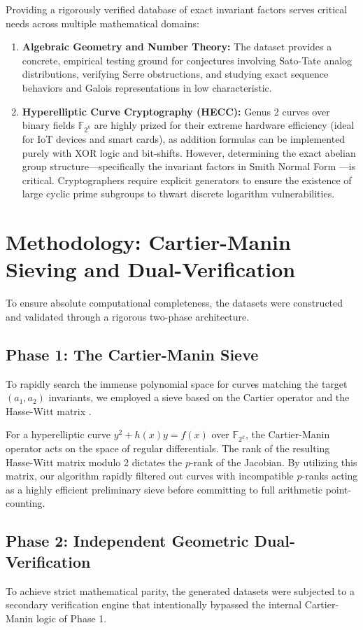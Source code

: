 \documentclass[12pt]{article}
\begin{document}
Providing a rigorously verified database of exact invariant factors serves critical needs across multiple mathematical domains:
\begin{enumerate}
    \item \textbf{Algebraic Geometry and Number Theory:} The dataset provides a concrete, empirical testing ground for conjectures involving Sato-Tate analog distributions, verifying Serre obstructions, and studying exact sequence behaviors and Galois representations in low characteristic.
    \item \textbf{Hyperelliptic Curve Cryptography (HECC):} Genus 2 curves over binary fields $\mathbb{F}_{2^k}$ are highly prized for their extreme hardware efficiency (ideal for IoT devices and smart cards), as addition formulas can be implemented purely with XOR logic and bit-shifts. However, determining the exact abelian group structure---specifically the invariant factors in Smith Normal Form \cite{Smith1861}---is critical. Cryptographers require explicit generators to ensure the existence of large cyclic prime subgroups to thwart discrete logarithm vulnerabilities.
\end{enumerate}

\section{Methodology: Cartier-Manin Sieving and Dual-Verification}
To ensure absolute computational completeness, the datasets were constructed and validated through a rigorous two-phase architecture. 

\subsection{Phase 1: The Cartier-Manin Sieve}
To rapidly search the immense polynomial space for curves matching the target $(a_1, a_2)$ invariants, we employed a sieve based on the Cartier operator \cite{Cartier1958} and the Hasse-Witt matrix \cite{Manin1963}. 

For a hyperelliptic curve $y^2 + h(x)y = f(x)$ over $\mathbb{F}_{2^k}$, the Cartier-Manin operator acts on the space of regular differentials. The rank of the resulting Hasse-Witt matrix modulo 2 dictates the $p$-rank of the Jacobian. By utilizing this matrix, our algorithm rapidly filtered out curves with incompatible $p$-ranks acting as a highly efficient preliminary sieve before committing to full arithmetic point-counting.

\subsection{Phase 2: Independent Geometric Dual-Verification}
To achieve strict mathematical parity, the generated datasets were subjected to a secondary verification engine that intentionally bypassed the internal Cartier-Manin logic of Phase 1.
\end{document}
